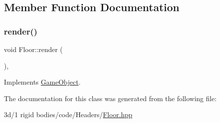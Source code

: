 \subsection{Member Function Documentation}
\mbox{\label{class_floor_a243d39104b6aacb662481be4fda2d72e}} 
\subsubsection{\texorpdfstring{render()}{render()}}
{\footnotesize\ttfamily void Floor\+::render (\begin{DoxyParamCaption}{ }\end{DoxyParamCaption})\hspace{0.3cm}{\ttfamily [override]}, {\ttfamily [virtual]}}



Implements \mbox{\hyperlink{class_game_object_adee58d508cfa907162d1192a25dc21b9}{Game\+Object}}.



The documentation for this class was generated from the following file\+:\begin{DoxyCompactItemize}
\item 
3d/1 rigid bodies/code/\+Headers/\mbox{\hyperlink{_floor_8hpp}{Floor.\+hpp}}\end{DoxyCompactItemize}
